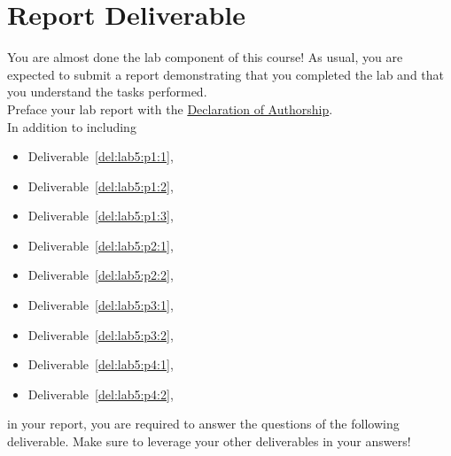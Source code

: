 \section{Report Deliverable}\label{Lab:5:Report}
You are almost done the lab component of this course!
As usual, you are expected to submit a report demonstrating that you completed the lab and that you understand the tasks performed.\\
Preface your lab report with the \hyperlink{intro:decl}{Declaration of Authorship}.\\
In addition to including
\begin{itemize}
  \item{Deliverable~\ref{del:lab5:p1:1},}
  \item{Deliverable~\ref{del:lab5:p1:2},}
  \item{Deliverable~\ref{del:lab5:p1:3},}
  \item{Deliverable~\ref{del:lab5:p2:1},}
  \item{Deliverable~\ref{del:lab5:p2:2},}
  \item{Deliverable~\ref{del:lab5:p3:1},}
  \item{Deliverable~\ref{del:lab5:p3:2},}
  \item{Deliverable~\ref{del:lab5:p4:1},}
  \item{Deliverable~\ref{del:lab5:p4:2},}
\end{itemize}
in your report, you are required to answer the questions of the following deliverable.
Make sure to leverage your other deliverables in your answers!
